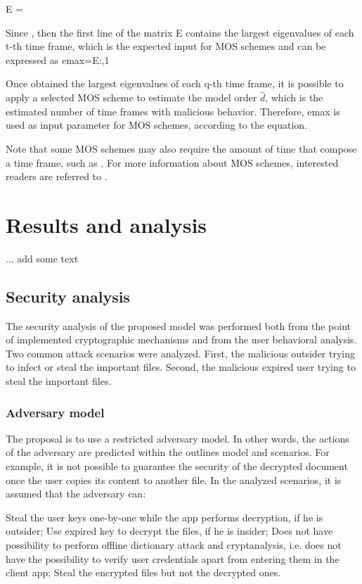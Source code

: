 \documentclass[twocolumn]{svjour3}          %
\begin{document}
E =                                                                                             

Since   , then the first line of the matrix E contains the largest eigenvalues of each t-th time frame, which is the expected input for MOS schemes and can be expressed as 
emax=E{:,1}

Once obtained the largest eigenvalues of each q-th time frame, it is possible to apply a selected MOS scheme to estimate the model order $\hat{d}$, which is the estimated number of time frames with malicious behavior. Therefore, emax is used as input parameter for MOS schemes, according to the equation.

Note that some MOS schemes may also require the amount of time that compose a time frame, such as . For more information about MOS schemes, interested readers are referred to \cite{da2009comparison}.

\section{Results and analysis}
\label{sec_mos}

... add some text

\subsection{Security analysis}
\label{sec_sec_analysis}
The security analysis of the proposed model was performed both from the point of implemented cryptographic mechanisms and from the user behavioral analysis. Two common attack scenarios were analyzed. First, the malicious outsider trying to infect or steal the important files. Second, the malicious expired user trying to steal the important files. 

\subsubsection{Adversary model}
\label{sec_adversary_model}
The proposal is to use a restricted adversary model. In other words, the actions of the adversary are predicted within the outlines model and scenarios. For example, it is not possible to guarantee the security of the decrypted document once the user copies its content to another file. In the analyzed scenarios, it is assumed that the adversary can:

Steal the user keys one-by-one while the app performs decryption, if he is outsider;
Use expired key to decrypt the files, if he is insider;
Does not have possibility to perform offline dictionary attack and cryptanalysis, i.e. does not have the possibility to verify user credentials apart from entering them in the client app;
Steal the encrypted files but not the decrypted ones.
\end{document}
